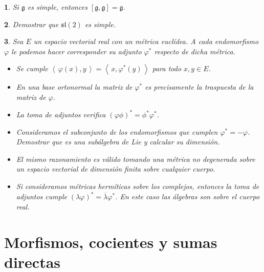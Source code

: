\documentclass[a4paper,draft,12pt]{article}
\newtheorem{pro1}{}%
\newenvironment{pro}{\begin{pro1} \rm} {\end{pro1}}
\newcommand{\g}{\mathfrak{g}}%
\newcommand{\escalar}[2]{\left\langle\, #1,#2\, \right\rangle}  %
\begin{document}
\begin{pro}

Si $\g$ es simple, entonces $[\g,\g]=\g$.

\end{pro}




\begin{pro}

Demostrar que $\mathfrak{sl}(2)$ es simple.

\end{pro}


\begin{pro}

Sea $E$ un espacio vectorial real con un métrica euclídea.  A cada endomorfismo $\varphi$ le podemos hacer corresponder su adjunto $\varphi^*$ respecto de dicha métrica.

\begin{itemize}

\item Se cumple $\escalar{\varphi(x)}{y}= \escalar{x}{\varphi^*(y)}$ para todo $x, y \in E$.

\item En una base ortonormal la matriz de $\varphi^*$ es precisamente la traspuesta de la matriz de $\varphi$.

\item La toma de adjuntos verifica $(\varphi \phi)^*= \phi^*\varphi^*$.

\item Consideramos el subconjunto de los endomorfismos que cumplen $\varphi^*= - \varphi$.  Demostrar que es una subálgebra de Lie y calcular su dimensión.

\item El mismo razonamiento es válido tomando una métrica no degenerada sobre un espacio vectorial de dimensión finita sobre cualquier cuerpo.

\item  Si consideramos métricas hermíticas sobre los complejos, entonces la toma de adjuntos cumple $(\lambda \varphi)^*= \overline{\lambda}\varphi^*$.  En este caso las álgebras son sobre el cuerpo real.

\end{itemize}


\end{pro}


\newpage

\section{Morfismos, cocientes y sumas directas}
\end{document}
